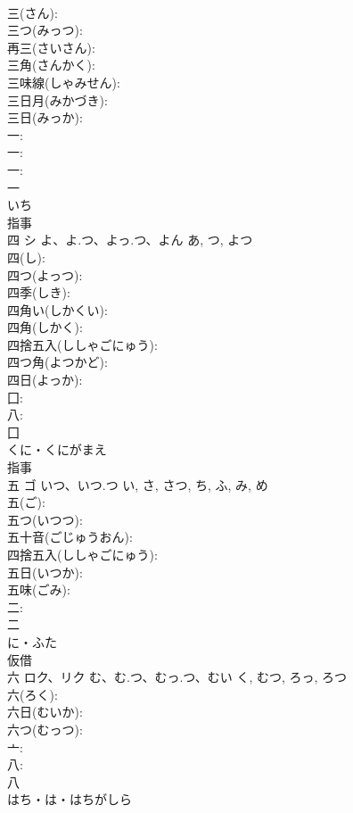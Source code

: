 \documentclass[8pt]{extreport}
\begin{document}
\begin{CJK}{UTF8}{min}
\\	三(さん): 
\\	三つ(みっつ): 
\\	再三(さいさん): 
\\	三角(さんかく): 
\\	三味線(しゃみせん): 
\\	三日月(みかづき): 
\\	三日(みっか): 
\\	一: 
\\	一: 
\\	一: 
\\	一	
\\	いち	
\\	指事 
\\	四	シ	よ、よ.つ、よっ.つ、よん	あ, つ, よつ	
\\	四(し): 
\\	四つ(よっつ): 
\\	四季(しき): 
\\	四角い(しかくい): 
\\	四角(しかく): 
\\	四捨五入(ししゃごにゅう): 
\\	四つ角(よつかど): 
\\	四日(よっか): 
\\	囗: 
\\	八: 
\\	囗	
\\	くに・くにがまえ	
\\	指事 
\\	五	ゴ	いつ、いつ.つ	い, さ, さつ, ち, ふ, み, め	
\\	五(ご): 
\\	五つ(いつつ): 
\\	五十音(ごじゅうおん): 
\\	四捨五入(ししゃごにゅう): 
\\	五日(いつか): 
\\	五味(ごみ): 
\\	二: 
\\	二	
\\	に・ふた	
\\	仮借 
\\	六	ロク、リク	む、む.つ、むっ.つ、むい	く, むつ, ろっ, ろつ	
\\	六(ろく): 
\\	六日(むいか): 
\\	六つ(むっつ): 
\\	亠: 
\\	八: 
\\	八	
\\	はち・は・はちがしら	

\end{CJK}
\end{document}
